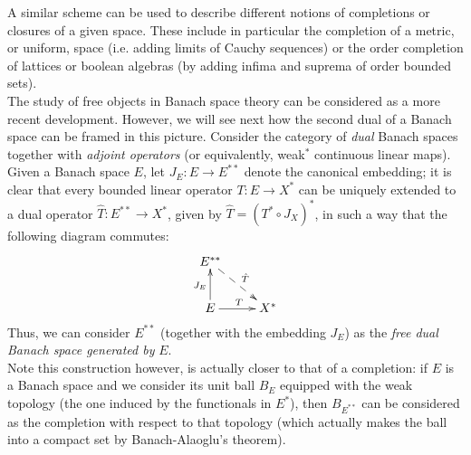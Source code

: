 \documentclass[12pt,leqno]{amsart}
\numberwithin{equation}{section} %
\theoremstyle{definition}
\numberwithin{equation}{section}
\begin{document}
A similar scheme can be used to describe different notions of completions or closures of a given space. These include in particular the completion of a metric, or uniform, space (i.e. adding limits of Cauchy sequences) or the order completion of lattices or boolean algebras (by adding infima and suprema of order bounded sets). \\

The study of free objects in Banach space theory can be considered as a more recent development. However, we will see next how the second dual of a Banach space can be framed in this picture.
Consider the category of \textit{dual} Banach spaces together with \textit{adjoint operators} (or equivalently, weak$^*$ continuous linear maps). Given a Banach space $E$, let $J_E:E\rightarrow E^{**}$ denote the canonical embedding; it is clear that every bounded linear operator $T:E\rightarrow X^*$ can be uniquely extended to a dual operator $\hat T:E^{**}\rightarrow X^*$, given by $\hat{T}=(T^*\circ J_X)^*$, in such a way that the following diagram commutes:
$$
\xymatrix{E^{**}\ar@{-->}[rd]^{\hat{T}}&\\
     E\ar[r]^{T}\ar^{J_E}[u]& X^*}
$$
Thus, we can consider $E^{**}$ (together with the embedding $J_E$) as the \textit{free dual Banach space generated by} $E$.\\

Note this construction however, is actually closer to that of a completion: if $E$ is a Banach space and we consider its unit ball $B_{E}$ equipped with the weak topology (the one induced by the functionals in $E^*$), then $B_{E^{**}}$ can be considered as the completion with respect to that topology (which actually makes the ball into a compact set by Banach-Alaoglu's theorem).\\
\end{document}
